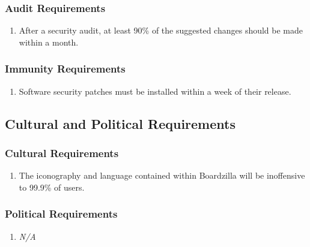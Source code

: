 \documentclass{article}
\begin{document}
	\subsubsection{Audit Requirements}
	\label{ssub:audit_requirements}
	\begin{enumerate}[{SR}1. ]
		\item After a security audit, at least 90\% of the suggested changes should be made within a month.
	\end{enumerate}
	
	\subsubsection{Immunity Requirements}
	\label{ssub:immunity_requirements}
	\begin{enumerate}[{SR}1. ]
		\item Software security patches must be installed within a week of their release.
	\end{enumerate}
	
	
	\subsection{Cultural and Political Requirements}
	\label{sub:cultural_and_political_requirements}
	
	\subsubsection{Cultural Requirements}
	\label{ssub:cultural_requirements}
	\begin{enumerate}[{CP}1. ]
		\item The iconography and language contained within Boardzilla will be inoffensive to 99.9\% of users.
	\end{enumerate}
	
	\subsubsection{Political Requirements}
	\label{ssub:political_requirements}
	\begin{enumerate}[{CP}1. ]
		\item \emph{N/A}
	\end{enumerate}
	
\end{document}
